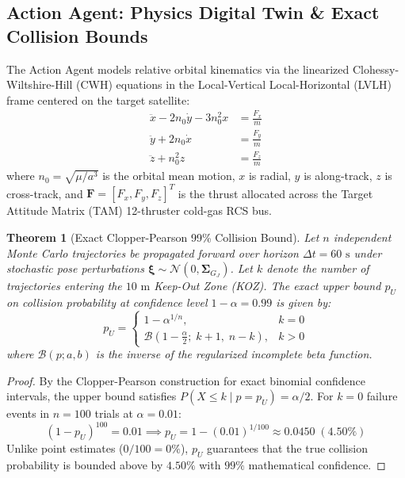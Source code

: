 \documentclass[conference]{IEEEtran}
\newtheorem{theorem}{Theorem}
\begin{document}
\subsection{Action Agent: Physics Digital Twin \& Exact Collision Bounds}

The Action Agent models relative orbital kinematics via the linearized Clohessy-Wiltshire-Hill (CWH) equations in the Local-Vertical Local-Horizontal (LVLH) frame centered on the target satellite:
\begin{equation}
\begin{aligned}
\ddot{x} - 2n_0\dot{y} - 3n_0^2 x &= \frac{F_x}{m} \\
\ddot{y} + 2n_0\dot{x} &= \frac{F_y}{m} \\
\ddot{z} + n_0^2 z &= \frac{F_z}{m}
\end{aligned}
\label{eq:cwh}
\end{equation}
where $n_0 = \sqrt{\mu / a^3}$ is the orbital mean motion, $x$ is radial, $y$ is along-track, $z$ is cross-track, and $\mathbf{F} = [F_x, F_y, F_z]^T$ is the thrust allocated across the Target Attitude Matrix (TAM) 12-thruster cold-gas RCS bus.

\begin{theorem}[Exact Clopper-Pearson 99\% Collision Bound]
Let $n$ independent Monte Carlo trajectories be propagated forward over horizon $\Delta t = 60\text{ s}$ under stochastic pose perturbations $\boldsymbol{\xi} \sim \mathcal{N}(0, \boldsymbol{\Sigma}_{G_J})$. Let $k$ denote the number of trajectories entering the $10\text{ m}$ Keep-Out Zone (KOZ). The exact upper bound $p_U$ on collision probability at confidence level $1 - \alpha = 0.99$ is given by:
\begin{equation}
p_U = \begin{cases}
1 - \alpha^{1/n}, & k = 0 \\
\mathcal{B}\left(1 - \frac{\alpha}{2}; \; k + 1, \; n - k\right), & k > 0
\end{cases}
\label{eq:clopper_pearson}
\end{equation}
where $\mathcal{B}(p; a, b)$ is the inverse of the regularized incomplete beta function.
\end{theorem}

\begin{proof}
By the Clopper-Pearson construction for exact binomial confidence intervals, the upper bound satisfies $P(X \le k \mid p = p_U) = \alpha / 2$. For $k=0$ failure events in $n=100$ trials at $\alpha=0.01$:
\begin{equation}
(1 - p_U)^{100} = 0.01 \implies p_U = 1 - (0.01)^{1/100} \approx 0.0450 \; (4.50\%)
\end{equation}
Unlike point estimates ($0/100 = 0\%$), $p_U$ guarantees that the true collision probability is bounded above by $4.50\%$ with $99\%$ mathematical confidence.
\end{proof}
\end{document}
